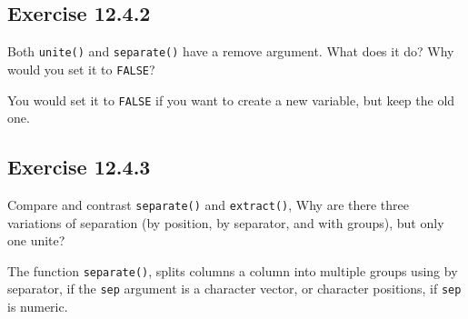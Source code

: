 \documentclass[]{book}
\newenvironment{Shaded}{\begin{snugshade}}{\end{snugshade}}
\newcommand{\CommentTok}[1]{\textcolor[rgb]{0.56,0.35,0.01}{\textit{#1}}}
\newcommand{\DataTypeTok}[1]{\textcolor[rgb]{0.13,0.29,0.53}{#1}}
\newcommand{\DecValTok}[1]{\textcolor[rgb]{0.00,0.00,0.81}{#1}}
\newcommand{\KeywordTok}[1]{\textcolor[rgb]{0.13,0.29,0.53}{\textbf{#1}}}
\newcommand{\NormalTok}[1]{#1}
\newcommand{\OperatorTok}[1]{\textcolor[rgb]{0.81,0.36,0.00}{\textbf{#1}}}
\newcommand{\StringTok}[1]{\textcolor[rgb]{0.31,0.60,0.02}{#1}}
\theoremstyle{plain}
\theoremstyle{remark}
\begin{document}
\hypertarget{exercise-12.4.2}{%
\subsection*{\texorpdfstring{Exercise
{12.4.2}}{Exercise 12.4.2}}\label{exercise-12.4.2}}

Both \texttt{unite()} and \texttt{separate()} have a remove argument.
What does it do? Why would you set it to \texttt{FALSE}?

You would set it to \texttt{FALSE} if you want to create a new variable,
but keep the old one.

\hypertarget{exercise-12.4.3}{%
\subsection*{\texorpdfstring{Exercise
{12.4.3}}{Exercise 12.4.3}}\label{exercise-12.4.3}}

Compare and contrast \texttt{separate()} and \texttt{extract()}, Why are
there three variations of separation (by position, by separator, and
with groups), but only one unite?

The function \texttt{separate()}, splits columns a column into multiple
groups using by separator, if the \texttt{sep} argument is a character
vector, or character positions, if \texttt{sep} is numeric.

\begin{Shaded}
\end{Shaded}
\end{document}

